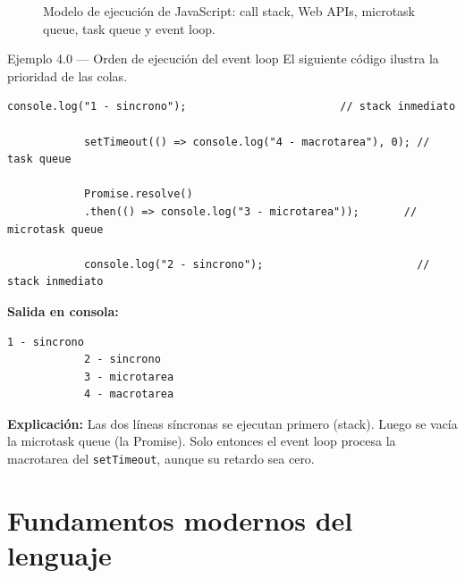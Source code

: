 \documentclass[11pt,a4paper,openany]{book}
\begin{document}
\begin{figure}[htbp]
		\caption{Modelo de ejecución de JavaScript: call stack, Web APIs,
			microtask queue, task queue y event loop.}
		\label{fig:4.eventloop}
	\end{figure}
	
	\begin{cajaejemplo}{Ejemplo 4.0 — Orden de ejecución del event loop}
		El siguiente código ilustra la prioridad de las colas.
		
		\begin{lstlisting}[style=js,numbers=none,caption={Orden observable en la consola},
			label=lst:4.0]
			console.log("1 - sincrono");                        // stack inmediato
			
			setTimeout(() => console.log("4 - macrotarea"), 0); // task queue
			
			Promise.resolve()
			.then(() => console.log("3 - microtarea"));       // microtask queue
			
			console.log("2 - sincrono");                        // stack inmediato
		\end{lstlisting}
		
		\textbf{Salida en consola:}
		\begin{lstlisting}[style=shell,numbers=none]
			1 - sincrono
			2 - sincrono
			3 - microtarea
			4 - macrotarea
		\end{lstlisting}
		
		\textbf{Explicación:} Las dos líneas síncronas se ejecutan primero
		(stack). Luego se vacía la microtask queue (la Promise). Solo
		entonces el event loop procesa la macrotarea del \texttt{setTimeout},
		aunque su retardo sea cero.
	\end{cajaejemplo}
	
	\section{Fundamentos modernos del lenguaje}
	\label{sec:4.fundamentos}
	
\end{document}
